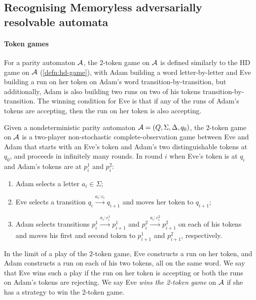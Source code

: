 \subsection{Recognising Memoryless adversarially resolvable automata}\label{appendixsubsec:np-completeness}

\paragraph*{Token games}

For a parity automaton $\mathcal{A}$, the 2-token game on $\mathcal{A}$ is defined similarly to the HD game on $\mathcal{A}$ (\cref{defn:hd-game}), with Adam building a word letter-by-letter and Eve building a run on her token on Adam's word transition-by-transition, but additionally, Adam is also building two runs on two of his tokens transition-by-transition. The winning condition for Eve is that if any of the runs of Adam's tokens are accepting, then the run on her token is also accepting.

\begin{definition}\label{defn:twotokengame}
Given a nondeterministic parity automaton $\mathcal{A}=(Q,\Sigma,\Delta,q_0)$, the $2$-token game on $\mathcal{A}$ is a two-player non-stochastic complete-observation game between Eve and Adam that starts with an Eve's token and Adam's two distinguishable tokens at $q_0$, and proceeds in infinitely many rounds. In round $i$ when Eve's token is at $q_i$ and Adam's tokens are at $p^1_i$ and $p^2_i$:
\begin{enumerate}
    \item Adam selects a letter $a_i\in\Sigma$;
    \item Eve selects a transition $q_i\xrightarrow{a_i:c_i}q_{i+1}$ and moves her token to $q_{i+1}$;
    \item Adam selects transitions $p^1_i\xrightarrow{a_i:c^1_i}p^1_{i+1}$ and $p^2_i\xrightarrow{a_i:c^2_i}p^2_{i+1}$ on each of his tokens and moves his first and second token to $p^1_{i+1}$ and $p^2_{i+1}$, respectively.
\end{enumerate}
In the limit of a play of the $2$-token game, Eve constructs a run on her token, and Adam constructs a run on each of his two tokens, all on the same word. We say that Eve wins such a play if the run on her token is accepting or both the runs on Adam's tokens are rejecting. We say Eve \emph{wins the 2-token game} on $\mathcal{A}$ if she has a strategy to win the 2-token game.
\end{definition}

